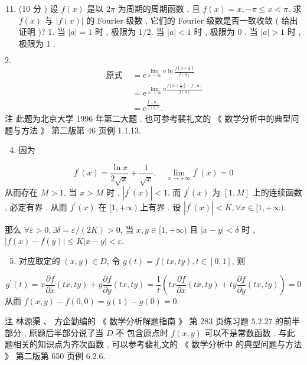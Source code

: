 \documentclass[10pt]{article}
\begin{document}
\begin{enumerate}
  \setcounter{enumi}{10}
  \item (10  分 )  设  $f(x)$  是以  $2 \pi$  为周期的周期函数 ,  且  $f(x)=x,-\pi \leqslant x<\pi$.  求  $f(x)$  与  $|f(x)|$  的  Fourier  级数 ,  它们的  Fourier  级数是否一致收敛  ( 给出证明 )? 1.  当  $|a|=1$  时 ,  极限为  $1 / 2$.  当  $|a|<1$  时 ,  极限为  0 .  当  $|a|>1$  时 ,  极限为  1 .
\end{enumerate}
$2 .$
$$
\begin{aligned}
\text { 原式 } &=\mathrm{e}^{\lim _{n \rightarrow \infty} n \ln \frac{f\left(a+\frac{1}{n}\right)}{f(a)}} \\
&=\mathrm{e}^{\lim _{n \rightarrow \infty} n \frac{f\left(a+\frac{1}{n}\right)-f(a)}{f(a)}} \\
&=\mathrm{e}^{\frac{f^{\prime}(a)}{f(a)}} .
\end{aligned}
$$
 注   此题为北京大学  1996  年第二大题 .  也可参考裴礼文的 《 数学分析中的典型问题与方法 》 第二版第  46  页例  1.1.13.

\begin{enumerate}
  \setcounter{enumi}{3}
  \item  因为 
\end{enumerate}
$$
f^{\prime}(x)=\frac{\ln x}{2 \sqrt{x}}+\frac{1}{\sqrt{x}}, \quad \lim _{x \rightarrow+\infty} f^{\prime}(x)=0
$$
 从而存在  $M>1$,  当  $x>M$  时 , $\left|f^{\prime}(x)\right|<1$.  而  $f^{\prime}(x)$  为  $[1, M]$  上的连续函数 ,  必定有界 .  从而  $f^{\prime}(x)$  在  $[1,+\infty)$  上有界 .  设  $\left|f^{\prime}(x)\right|<K, \forall x \in[1,+\infty)$.

 那么  $\forall \varepsilon>0, \exists \delta=\varepsilon /(2 K)>0$,  当  $x, y \in[1,+\infty)$  且  $|x-y|<\delta$  时 , $|f(x)-f(y)| \leqslant K|x-y|<\varepsilon$.

\begin{enumerate}
  \setcounter{enumi}{4}
  \item  对应取定的  $(x, y) \in D$,  令  $g(t)=f(t x, t y), t \in[0,1]$,  则 
\end{enumerate}
$$
g^{\prime}(t)=x \frac{\partial f}{\partial x}(t x, t y)+y \frac{\partial f}{\partial y}(t x, t y)=\frac{1}{t}\left(t x \frac{\partial f}{\partial x}(t x, t y)+t y \frac{\partial f}{\partial y}(t x, t y)\right)=0
$$
 从而  $f(x, y)-f(0,0)=g(1)-g(0)=0$.

 注   林源渠 、 方企勤编的 《 数学分析解题指南 》 第  283  页练习题  $5.2 .27$  的前半部分 ,  原题后半部分说了当  $D$  不   包含原点时  $f(x, y)$  可以不是常数函数 .  与此题相关的知识点为齐次函数 ,  可以参考裴礼文的  《 数学分析中   的典型问题与方法 》 第二版第  650  页例  $6.2 .6$.
\end{document}
